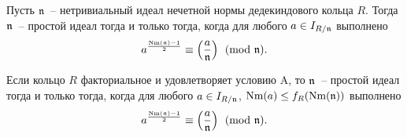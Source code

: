 \documentclass[_00_dissertation.tex]{subfiles}
\begin{document}
\begin{theorem}\label{theorem:euler_criteria}
    Пусть $\mathfrak{n}$~-- нетривиальный идеал нечетной нормы дедекиндового кольца $R$.
    Тогда $\mathfrak{n}$~-- простой идеал тогда и только тогда, когда для любого $a \in I_{R/\mathfrak{n}}$ выполнено
    \begin{equation*}
        a^{\frac{\textrm{Nm}(\mathfrak{n}) - 1}{2}} \equiv \left(\frac{a}{\mathfrak{n}}\right) \pmod{\mathfrak{n}}.
    \end{equation*}

    Если кольцо $R$ факториальное и удовлетворяет условию A, то $\mathfrak{n}$~-- простой идеал тогда и только тогда, когда для любого $a \in I_{R/\mathfrak{n}}$, $\textrm{Nm}(a) \le f_R(\textrm{Nm}(\mathfrak{n}))$ выполнено
    \begin{equation*}
        a^{\frac{\textrm{Nm}(\mathfrak{n}) - 1}{2}} \equiv \left(\frac{a}{\mathfrak{n}}\right) \pmod{\mathfrak{n}}.
    \end{equation*}
\end{theorem}
\end{document}
